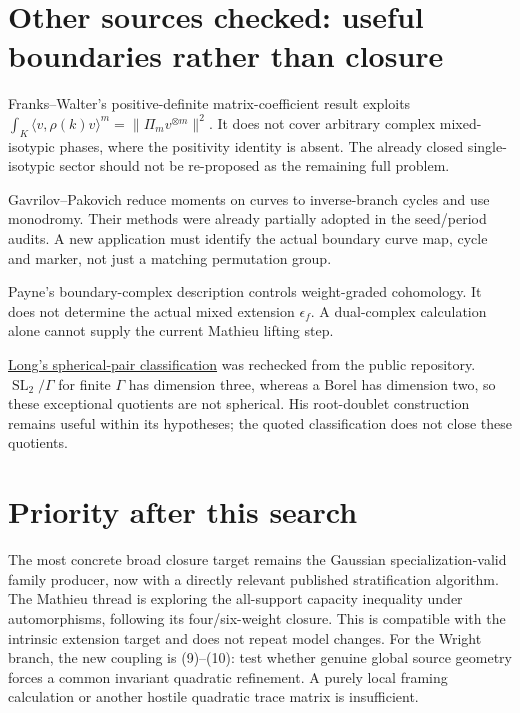 \documentclass[11pt]{article}
\newcommand{\SL}{\operatorname{SL}}
\begin{document}
\section{Other sources checked: useful boundaries rather than closure}

Franks--Walter's positive-definite matrix-coefficient result
\cite{fw} exploits
$\int_K\langle v,\rho(k)v\rangle^m=\|\Pi_m v^{\otimes m}\|^2$.
It does not cover arbitrary complex mixed-isotypic phases, where the
positivity identity is absent. The already closed single-isotypic sector
should not be re-proposed as the remaining full problem.

Gavrilov--Pakovich \cite{gp} reduce moments on curves to inverse-branch
cycles and use monodromy. Their methods were already partially adopted
in the seed/period audits. A new application must identify the actual
boundary curve map, cycle and marker, not just a matching permutation
group.

Payne's boundary-complex description \cite{payne} controls weight-graded
cohomology. It does not determine the actual mixed extension
$\epsilon_f$. A dual-complex calculation alone cannot supply the current
Mathieu lifting step.

\href{https://github.com/long-mathematics/mathieu-second-conjecture-spherical-pairs}{Long's spherical-pair classification} was rechecked from the public repository. $\SL_2/\Gamma$ for finite $\Gamma$ has dimension three, whereas
a Borel has dimension two, so these exceptional quotients are not
spherical. His root-doublet construction remains useful within its
hypotheses; the quoted classification does not close these quotients.

\section{Priority after this search}

The most concrete broad closure target remains the Gaussian
specialization-valid family producer, now with a directly relevant
published stratification algorithm. The Mathieu thread is exploring the all-support capacity inequality under
automorphisms, following its four/six-weight closure. This is compatible
with the intrinsic extension target and does not repeat model changes.
For the Wright branch, the new coupling is (9)--(10): test whether genuine
global source geometry forces a common invariant quadratic refinement.
A purely local framing calculation or another hostile quadratic trace
matrix is insufficient.
\end{document}
